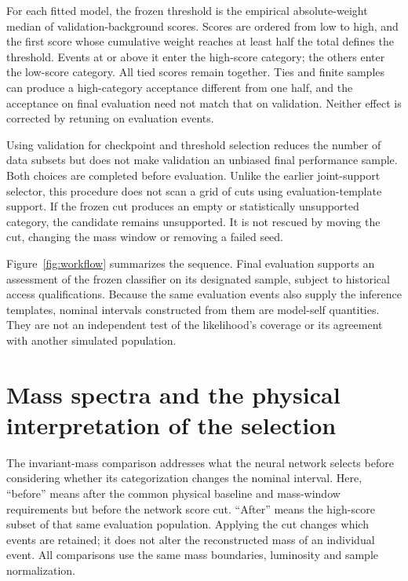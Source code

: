 \documentclass[aps,prd,reprint,superscriptaddress,nofootinbib,longbibliography,floatfix]{revtex4-2}
\let\label\OriginalLaTeXLabel
\begin{document}
For each fitted model, the frozen threshold is the empirical absolute-weight median of
validation-background scores. Scores are ordered from low to high, and the first score whose
cumulative weight reaches at least half the total defines the threshold. Events at or above
it enter the high-score category; the others enter the low-score category. All tied scores
remain together. Ties and finite samples can produce a high-category acceptance different
from one half, and the acceptance on final evaluation need not match that on validation.
Neither effect is corrected by retuning on evaluation events.

Using validation for checkpoint and threshold selection reduces the number of data subsets
but does not make validation an unbiased final performance sample. Both choices are
completed before evaluation. Unlike the earlier joint-support selector, this procedure does
not scan a grid of cuts using evaluation-template support. If the frozen cut produces an
empty or statistically unsupported category, the candidate remains unsupported. It is not
rescued by moving the cut, changing the mass window or removing a failed seed.

Figure~\ref{fig:workflow} summarizes the sequence. Final evaluation supports an assessment of the frozen
classifier on its designated sample, subject to historical access qualifications. Because
the same evaluation events also supply the inference templates, nominal intervals
constructed from them are model-self quantities. They are not an independent test of the
likelihood's coverage or its agreement with another simulated population.




\section{Mass spectra and the physical interpretation of the selection}
\label{sec:mass-spectra}

The invariant-mass comparison addresses what the neural network selects before considering
whether its categorization changes the nominal interval. Here, ``before'' means after the
common physical baseline and mass-window requirements but before the network score cut.
``After'' means the high-score subset of that same evaluation population. Applying the cut
changes which events are retained; it does not alter the reconstructed mass of an individual
event. All comparisons use the same mass boundaries, luminosity and sample normalization.
\end{document}
